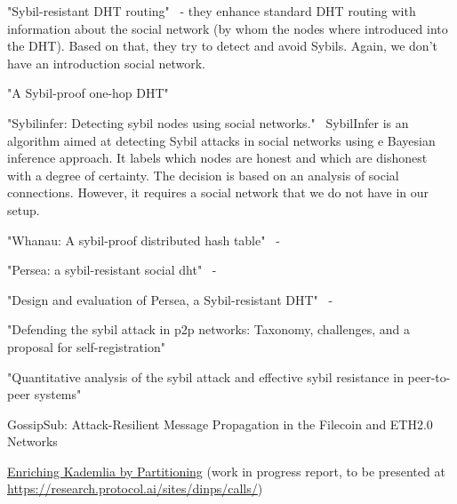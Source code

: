 

"Sybil-resistant DHT routing"~\cite{danezis2005sybil} - they enhance standard DHT routing with information about the social network (by whom the nodes where introduced into the DHT). Based on that, they try to detect and avoid Sybils. Again, we don't have an introduction social network. 

"A Sybil-proof one-hop DHT"~\cite{lesniewski2008sybil}

"Sybilinfer: Detecting sybil nodes using social networks."~\cite{danezis2009sybilinfer}
SybilInfer is an algorithm aimed at detecting Sybil attacks in social networks using e Bayesian inference approach.  It  labels which nodes are honest and which are dishonest with a degree of certainty. The decision is based on an analysis of social connections. However, it requires a social network that we do not have in our setup. 

"Whanau: A sybil-proof distributed hash table"~\cite{lesniewski2010whanau} - 


"Persea: a sybil-resistant social dht"~\cite{al2013persea} - 


"Design and evaluation of Persea, a Sybil-resistant DHT"~\cite{al2014design} - 

"Defending the sybil attack in p2p networks: Taxonomy, challenges, and a proposal for self-registration"~\cite{dinger2006defending}


"Quantitative analysis of the sybil attack and effective sybil resistance in peer-to-peer systems"~\cite{jetter2010quantitative}


GossipSub: Attack-Resilient Message Propagation in
the Filecoin and ETH2.0 Networks~\cite{gossipsub}

\href{https://asc.di.fct.unl.pt/~jleitao/pdf/dinps22-tr.pdf}{Enriching Kademlia by Partitioning} (work in progress report, to be presented at \href{DINPS2022 by Protocol Labs}{https://research.protocol.ai/sites/dinps/calls/})
